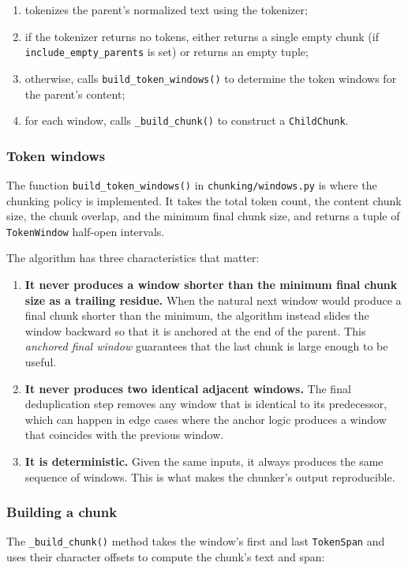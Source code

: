 \documentclass[11pt,a4paper]{article}
\begin{document}
\begin{enumerate}[leftmargin=1.5em,itemsep=0.15em]
  \item tokenizes the parent's normalized text using the tokenizer;
  \item if the tokenizer returns no tokens, either returns a single
    empty chunk (if \texttt{include\_empty\_parents} is set) or
    returns an empty tuple;
  \item otherwise, calls \texttt{build\_token\_windows()} to determine
    the token windows for the parent's content;
  \item for each window, calls \texttt{\_build\_chunk()} to construct
    a \texttt{ChildChunk}.
\end{enumerate}

\subsubsection{Token windows}
The function \texttt{build\_token\_windows()} in
\texttt{chunking/windows.py} is where the chunking policy is
implemented. It takes the total token count, the content chunk size,
the chunk overlap, and the minimum final chunk size, and returns a
tuple of \texttt{TokenWindow} half-open intervals.

The algorithm has three characteristics that matter:

\begin{enumerate}[leftmargin=1.5em,itemsep=0.15em]
  \item \textbf{It never produces a window shorter than the minimum
    final chunk size as a trailing residue.} When the natural
    next window would produce a final chunk shorter than the
    minimum, the algorithm instead slides the window backward so
    that it is anchored at the end of the parent. This
    \emph{anchored final window} guarantees that the last chunk is
    large enough to be useful.
  \item \textbf{It never produces two identical adjacent windows.}
    The final deduplication step removes any window that is
    identical to its predecessor, which can happen in edge cases
    where the anchor logic produces a window that coincides with
    the previous window.
  \item \textbf{It is deterministic.} Given the same inputs, it
    always produces the same sequence of windows. This is what makes
    the chunker's output reproducible.
\end{enumerate}

\subsubsection{Building a chunk}
The \texttt{\_build\_chunk()} method takes the window's first and
last \texttt{TokenSpan} and uses their character offsets to compute
the chunk's text and span:
\end{document}
